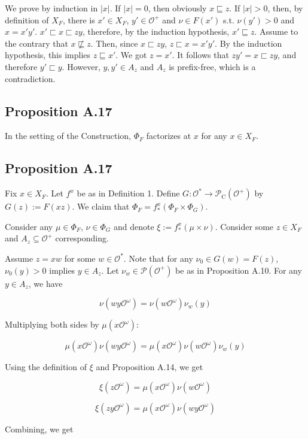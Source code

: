 \documentclass[a4paper]{article}
\newcommand{\Abs}[1]{\lvert #1 \rvert}
\newcommand{\Prob}{\mathcal{P}}
\newcommand{\Obs}{\mathcal{O}}
\newcommand{\ObsO}{\Obs^\omega}
\newcommand{\CC}{\mathcal{P}_{\operatorname{C}}}
\begin{document}
We prove by induction in ${\Abs{x}}$. If ${\Abs{x}=0}$, then obviously ${x \sqsubseteq z}$. If ${\Abs{x} > 0}$, then, by definition of ${X_F}$, there is ${x' \in X_F}$, ${y' \in \Obs^+}$ and ${\nu \in F(x')}$ s.t. ${\nu(y') > 0}$ and ${x = x'y'}$. ${x' \sqsubset x \sqsubset zy}$, therefore, by the induction hypothesis, ${x' \sqsubseteq z}$. Assume to the contrary that ${x \not\sqsubseteq z}$. Then, since ${x \sqsubset zy}$, ${z \sqsubset x = x'y'}$. By the induction hypothesis, this implies ${z \sqsubseteq x'}$. We got ${z = x'}$. It follows that ${zy' = x \sqsubset zy}$, and therefore ${y' \sqsubset y}$. However, ${y,y' \in A_z}$ and ${A_z}$ is prefix-free, which is a contradiction.

\subsection{Proposition A.17}

In the setting of the Construction, ${\Phi_F}$ factorizes at ${x}$ for any ${x \in X_F}$.

\subsection{Proposition A.17}

Fix ${x \in X_F}$. Let ${f^x}$ be as in Definition 1. Define ${G: \Obs^* \rightarrow \CC(\Obs^+)}$ by ${G(z):=F(xz)}$. We claim that ${\Phi_F = f^x_*(\Phi_F \times \Phi_G)}$.

Consider any ${\mu \in \Phi_F}$, ${\nu \in \Phi_G}$ and denote ${\xi:=f^x_*(\mu \times \nu)}$. Consider some ${z \in X_F}$ and ${A_z \subseteq \Obs^+}$ corresponding.

Assume ${z = xw}$ for some ${w \in \Obs^*}$. Note that for any ${\nu_0 \in G(w)=F(z)}$, ${\nu_0(y) > 0}$ implies ${y \in A_z}$. Let ${\nu_w \in \Prob(\Obs^+)}$ be as in Proposition A.10. For any ${y \in A_z}$, we have

$$\nu(wy\ObsO) = \nu(w\ObsO) \nu_w(y)$$

Multiplying both sides by ${\mu(x\ObsO)}$:

$$\mu(x\ObsO) \nu(wy\ObsO) = \mu(x\ObsO) \nu(w\ObsO) \nu_w(y)$$

Using the definition of ${\xi}$ and Proposition A.14, we get

$${\xi(z\ObsO)=\mu(x\ObsO) \nu(w\ObsO)}$$

$$\xi(zy\ObsO) = \mu(x\ObsO) \nu(wy\ObsO)$$

Combining, we get
\end{document}
